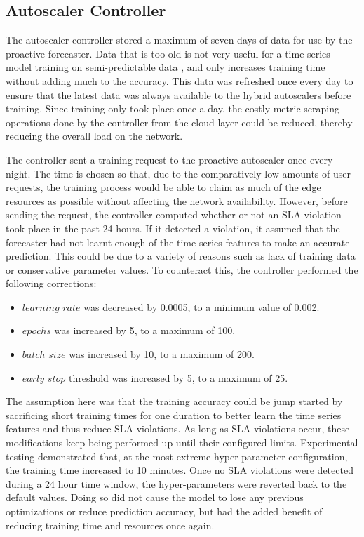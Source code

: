 \subsection{Autoscaler Controller}
\label{subsec:ch5-auto-daemon-subsection}

The autoscaler controller stored a maximum of seven days of data for use by the proactive forecaster. Data that is too old is not very useful for a time-series model training on semi-predictable data \cite{greff2016lstm}, and only increases training time without adding much to the accuracy. This data was refreshed once every day to ensure that the latest data was always available to the hybrid autoscalers before training. Since training only took place once a day, the costly metric scraping operations done by the controller from the cloud layer could be reduced, thereby reducing the overall load on the network.\par

The controller sent a training request to the proactive autoscaler once every night. The time is chosen so that, due to the comparatively low amounts of user requests, the training process would be able to claim as much of the edge resources as possible without affecting the network availability. However, before sending the request, the controller computed whether or not an SLA violation took place in the past 24 hours. If it detected a violation, it assumed that the forecaster had not learnt enough of the time-series features to make an accurate prediction. This could be due to a variety of reasons such as lack of training data or conservative parameter values. To counteract this, the controller performed the following corrections:

\begin{itemize}
    \item $learning\_rate$ was decreased by 0.0005, to a minimum value of 0.002.
    \item $epochs$ was increased by 5, to a maximum of 100.
    \item $batch\_size$ was increased by 10, to a maximum of 200.
    \item $early\_stop$ threshold was increased by 5, to a maximum of 25.
\end{itemize}

The assumption here was that the training accuracy could be jump started by sacrificing short training times for one duration to better learn the time series features and thus reduce SLA violations. As long as SLA violations occur, these modifications keep being performed up until their configured limits. Experimental testing demonstrated that, at the most extreme hyper-parameter configuration, the training time increased to 10 minutes. Once no SLA violations were detected during a 24 hour time window, the hyper-parameters were reverted back to the default values. Doing so did not cause the model to lose any previous optimizations or reduce prediction accuracy, but had the added benefit of reducing training time and resources once again.